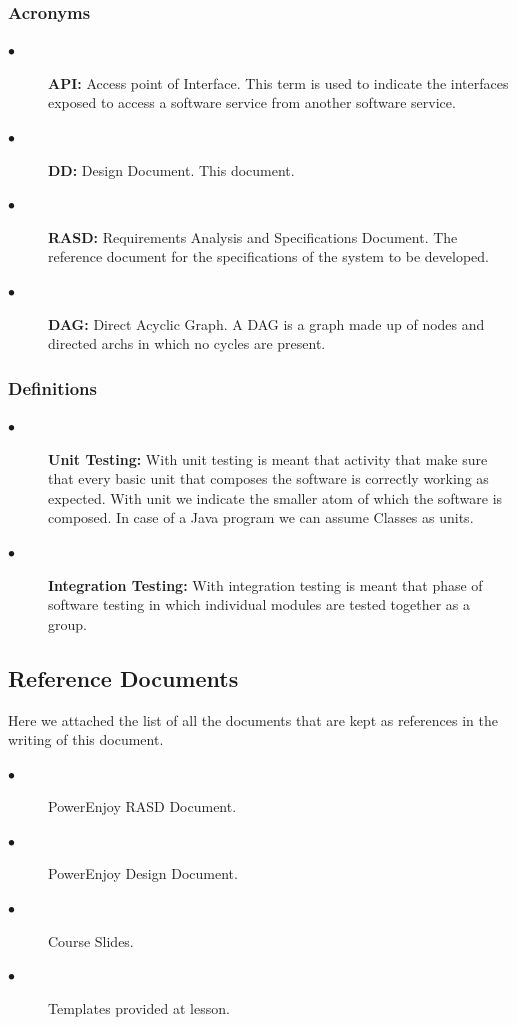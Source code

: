 \documentclass[a4paper,10pt]{article}
\begin{document}
  \subsubsection{Acronyms}
  \begin{description}
    \item[$\bullet$] \textbf{API:} Access point of Interface. This term is used to indicate the interfaces exposed to access a software
    service from another software service.
    \item[$\bullet$] \textbf{DD:} Design Document. This document.
    \item[$\bullet$] \textbf{RASD:} Requirements Analysis and Specifications Document. The reference document for the specifications of the system to be developed.
    \item[$\bullet$] \textbf{DAG:} Direct Acyclic Graph. A DAG is a graph made up of nodes and directed archs in which no cycles are present.
  \end{description}
  \subsubsection{Definitions}
   \begin{description}
   \item[$\bullet$] \textbf{Unit Testing:} With unit testing is meant that activity that make sure that every basic unit that composes the software is correctly 
   working as expected. With unit we indicate the smaller atom of which the software is composed. In case of a Java program we can assume Classes as units.
   \item[$\bullet$] \textbf{Integration Testing:} With integration testing is meant that phase 
   of software testing in which individual modules are tested together as a group.
   \end{description}
\subsection{Reference Documents}
Here we attached the list of all the documents that are kept as references in the writing of this document.
\begin{description}
    \item[$\bullet$] PowerEnjoy RASD Document.
    \item[$\bullet$] PowerEnjoy Design Document.
    \item[$\bullet$] Course Slides.
    \item[$\bullet$] Templates provided at lesson.
  \end{description}
 \newpage
 
\end{document}
